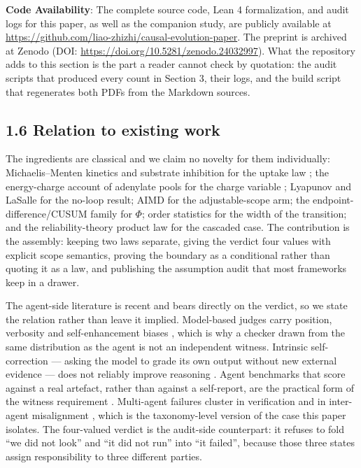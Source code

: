 \documentclass[11pt,a4paper]{article}
\begin{document}
\textbf{Code Availability}: The complete source code, Lean 4 formalization, and audit
logs for this paper, as well as the companion study, are publicly available at
\url{https://github.com/liao-zhizhi/causal-evolution-paper}. The preprint is
archived at Zenodo (DOI: \url{https://doi.org/10.5281/zenodo.24032997}). What the
repository adds to this section is the part a reader cannot check by quotation:
the audit scripts that produced every count in Section 3, their logs, and the
build script that regenerates both PDFs from the Markdown sources.

\subsection{1.6 Relation to existing work}\label{relation-to-existing-work}

The ingredients are classical and we claim no novelty for them individually:
Michaelis--Menten kinetics and substrate inhibition for the uptake law
\cite{johnson2011michaelis}; the energy-charge account of adenylate pools for
the charge variable \cite{atkinson1968}; Lyapunov and LaSalle for the no-loop
result; AIMD for the adjustable-scope arm; the endpoint-difference/CUSUM family
for \(\Phi\); order statistics for the width of the transition; and the
reliability-theory product law for the cascaded case. The
contribution is the assembly: keeping two laws separate, giving the verdict four
values with explicit scope semantics, proving the boundary as a conditional
rather than quoting it as a law, and publishing the assumption audit that most
frameworks keep in a drawer.

The agent-side literature is recent and bears directly on the verdict, so we
state the relation rather than leave it implied. Model-based judges carry
position, verbosity and self-enhancement biases \cite{zheng2023judging}, which is
why a checker drawn from the same distribution as the agent is not an
independent witness. Intrinsic self-correction --- asking the model to grade its
own output without new external evidence --- does not reliably improve reasoning
\cite{huang2023cannot,madaan2023selfrefine}. Agent benchmarks that score against
a real artefact, rather than against a self-report, are the practical form of
the witness requirement \cite{jimenez2023swebench}. Multi-agent failures cluster
in verification and in inter-agent misalignment \cite{cemri2025why}, which is the
taxonomy-level version of the case this paper isolates. The four-valued verdict
is the audit-side counterpart: it refuses to fold ``we did not look'' and ``it did
not run'' into ``it failed'', because those three states assign responsibility to
three different parties.
\end{document}
